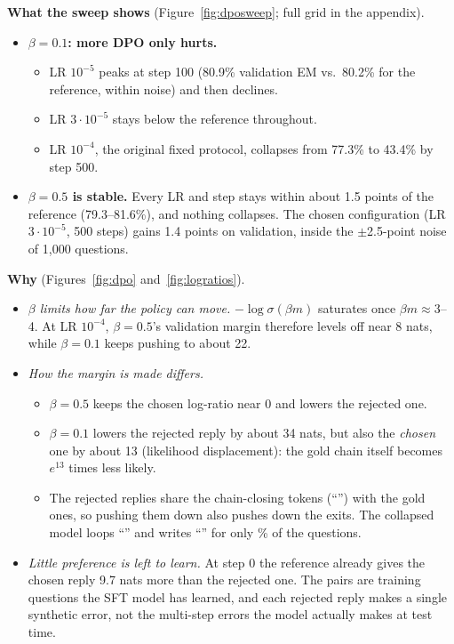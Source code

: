 \textbf{What the sweep shows} (Figure~\ref{fig:dposweep}; full grid in the appendix).
\begin{itemize}[leftmargin=*,nosep]
\item \textbf{$\beta=0.1$: more DPO only hurts.}
\begin{itemize}[leftmargin=*,nosep]
\item LR $10^{-5}$ peaks at step 100 (80.9\% validation EM vs.\ 80.2\% for the reference, within noise) and then declines.
\item LR $3\cdot10^{-5}$ stays below the reference throughout.
\item LR $10^{-4}$, the original fixed protocol, collapses from 77.3\% to 43.4\% by step 500.
\end{itemize}
\item \textbf{$\beta=0.5$ is stable.} Every LR and step stays within about 1.5 points of the reference (79.3--81.6\%), and nothing collapses. The chosen configuration (LR $3\cdot10^{-5}$, 500 steps) gains 1.4 points on validation, inside the $\pm$2.5-point noise of 1,000 questions.
\end{itemize}

\textbf{Why} (Figures~\ref{fig:dpo} and~\ref{fig:logratios}).
\begin{itemize}[leftmargin=*,nosep]
\item \emph{$\beta$ limits how far the policy can move.} $-\log\sigma(\beta m)$ saturates once $\beta m\approx3$--4. At LR $10^{-4}$, $\beta=0.5$'s validation margin therefore levels off near 8 nats, while $\beta=0.1$ keeps pushing to about 22.
\item \emph{How the margin is made differs.}
\begin{itemize}[leftmargin=*,nosep]
\item $\beta=0.5$ keeps the chosen log-ratio near 0 and lowers the rejected one.
\item $\beta=0.1$ lowers the rejected reply by about 34 nats, but also the \emph{chosen} one by about 13 (likelihood displacement): the gold chain itself becomes $e^{13}$ times less likely.
\item The rejected replies share the chain-closing tokens (``'') with the gold ones, so pushing them down also pushes down the exits. The collapsed model loops ``'' and writes ``'' for only \AdaFixLowAnsUnEnt\% of the questions.
\end{itemize}
\item \emph{Little preference is left to learn.} At step 0 the reference already gives the chosen reply 9.7 nats more than the rejected one. The pairs are training questions the SFT model has learned, and each rejected reply makes a single synthetic error, not the multi-step errors the model actually makes at test time.
\end{itemize}

